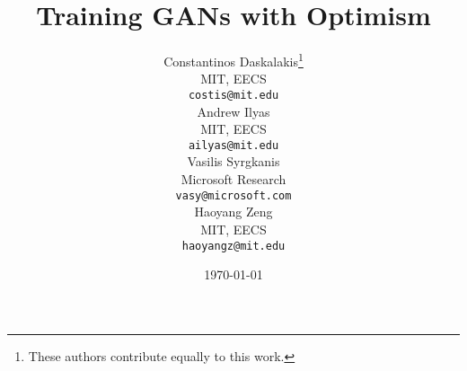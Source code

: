 \documentclass{article} %
\newcommand{\1}{\mathbbm{1}}
\theoremstyle{plain}
\begin{document}


\title{Training GANs with Optimism}

%
\newcommand*\samethanks[1][\value{footnote}]{\footnotemark[#1]}
\author{Constantinos Daskalakis\thanks{These authors contribute equally to this work.}\\
MIT, EECS\\
\texttt{costis@mit.edu}\\
\And  
Andrew Ilyas\samethanks\\
MIT, EECS\\
\texttt{ailyas@mit.edu}\\
\And
Vasilis Syrgkanis\samethanks\\
Microsoft Research\\
\texttt{vasy@microsoft.com}\\
\AND	
Haoyang Zeng\samethanks\\
MIT, EECS\\
\texttt{haoyangz@mit.edu}}


\date{\today}
\maketitle
\end{document}

